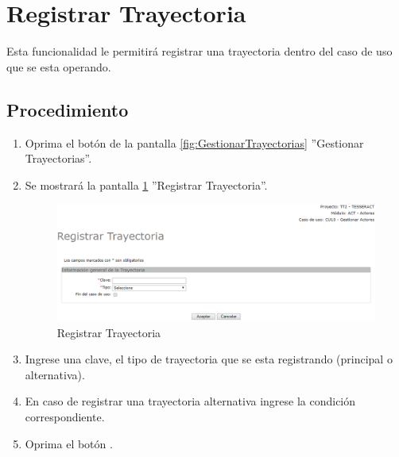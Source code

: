 
\hypertarget{cv:registrarTray}{\section{Registrar Trayectoria}} \label{sec:registrarTray}

	Esta funcionalidad le permitirá registrar una trayectoria dentro del caso de uso que se esta operando.

		\subsection{Procedimiento}

			\begin{enumerate}
	
			\item Oprima el botón \IURegistrar{} de la pantalla \ref{fig:GestionarTrayectorias} ''Gestionar Trayectorias''.
			
			\item Se mostrará la pantalla \ref{fig:registrarTray} ''Registrar Trayectoria''.

			\begin{figure}[H]
				\begin{center}
					\includegraphics[scale=0.6]{roles/lider/casosUso/trayectorias/pantallas/IU6-1-1-1registrarTray}
					\caption{Registrar Trayectoria}
					\label{fig:registrarTray}
				\end{center}
			\end{figure}
		
			\item Ingrese una clave, el tipo de trayectoria que se esta registrando (principal o alternativa).
			
			\item En caso de registrar una trayectoria alternativa ingrese la condición correspondiente. 
			
			\item Oprima el botón \IUAceptar.
			

\end{enumerate}
